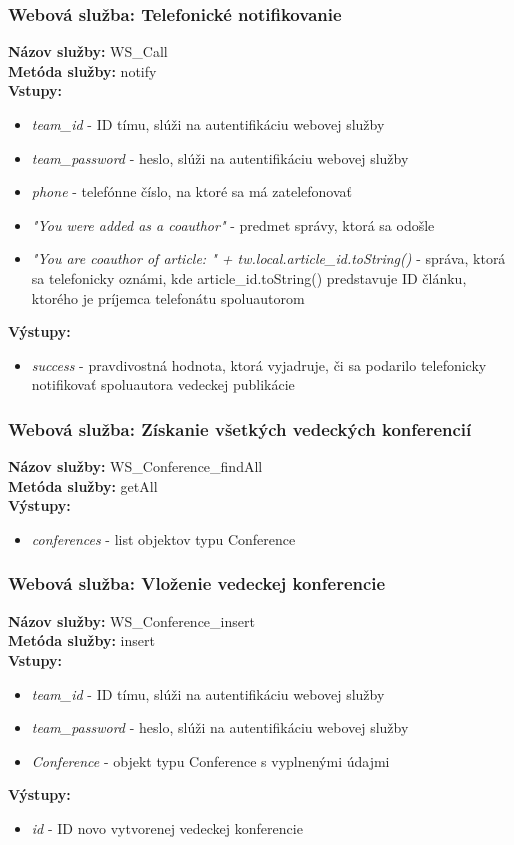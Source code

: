 \documentclass[10pt,oneside,slovak,a4paper]{article}
\begin{document}
\subsubsection{Webová služba: Telefonické notifikovanie}
\textbf{Názov služby:} WS\_Call\\
\textbf{Metóda služby:} notify\\
\textbf{Vstupy:}
	\begin{itemize}
		\item \textit{team\_id} - ID tímu, slúži na autentifikáciu webovej služby
		\item \textit{team\_password} - heslo, slúži na autentifikáciu webovej služby
		\item \textit{phone} - telefónne číslo, na ktoré sa má zatelefonovať
		\item \textit{"You were added as a coauthor"} - predmet správy, ktorá sa odošle
		\item \textit{"You are coauthor of article: " + tw.local.article\_id.toString()} - správa, ktorá sa telefonicky oznámi, kde article\_id.toString() predstavuje ID článku, ktorého je príjemca telefonátu spoluautorom
	\end{itemize}
\textbf{Výstupy:}
	\begin{itemize}
		\item \textit{success} - pravdivostná hodnota, ktorá vyjadruje, či sa podarilo telefonicky notifikovať spoluautora vedeckej publikácie
	\end{itemize}
	
\subsubsection{Webová služba: Získanie všetkých vedeckých konferencií}
\textbf{Názov služby:} WS\_Conference\_findAll\\
\textbf{Metóda služby:} getAll\\
\textbf{Výstupy:}
	\begin{itemize}
		\item \textit{conferences} - list objektov typu Conference
	\end{itemize}
	
\subsubsection{Webová služba: Vloženie vedeckej konferencie}
\textbf{Názov služby:} WS\_Conference\_insert\\
\textbf{Metóda služby:} insert\\
\textbf{Vstupy:}
	\begin{itemize}
		\item \textit{team\_id} - ID tímu, slúži na autentifikáciu webovej služby
		\item \textit{team\_password} - heslo, slúži na autentifikáciu webovej služby
		\item \textit{Conference} - objekt typu Conference s vyplnenými údajmi
	\end{itemize}
\textbf{Výstupy:}
	\begin{itemize}
		\item \textit{id} - ID novo vytvorenej vedeckej konferencie
	\end{itemize}
	
\end{document}
